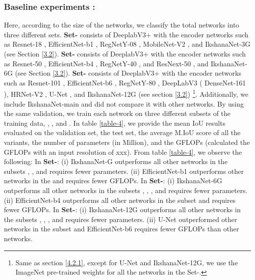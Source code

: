 \documentclass{article}
\begin{document}
\subsubsection{Baseline experiments :}
\label{4.3.1}
Here, according to the size of the networks, we classify the total networks into three different sets. \newline
\textbf{Set-} consists of DeeplabV3+ \cite{chen2018encoder} with the encoder networks such as Resnet-18 \cite{he2016deep}, EfficientNet-b1 \cite{TanL19}, RegNetY-08 \cite{RegNet}, MobileNet-V2 \cite{mobileNetV2}, and IkshanaNet-3G (see Section \ref{3.2}). \newline
\textbf{Set-} consists of  DeeplabV3+ \cite{chen2018encoder} with the encoder networks such as Resnet-50 \cite{he2016deep}, EfficientNet-b4 \cite{TanL19}, RegNetY-40 \cite{RegNet}, and ResNext-50 \cite{Resnext}, and IkshanaNet-6G (see Section \ref{3.2}). \newline
\textbf{Set-} consists of DeeplabV3+ \cite{chen2018encoder} with the encoder networks such as Resnet-101 \cite{he2016deep}, EfficientNet-b6 \cite{TanL19}, RegNetY-80 \cite{RegNet},  DeepLabV3 ( DenseNet-161 \cite{huang2017densely}), HRNet-V2 \cite{SunZJCXLMWLW19}, U-Net \cite{ronneberger2015u}, and IkshanaNet-12G (see section \ref{3.2}) \footnote{Same as section \ref{4.2.1}, except for U-Net \cite{ronneberger2015u} and IkshanaNet-12G, we use the ImageNet \cite{deng2009imagenet} pre-trained weights for all the networks in the Set-.}.\newline
Additionally, we include IkshanaNet-main and did not compare it with other networks. By using the same validation, we train each network on three different subsets of the training data, , , and .\newline
In table \ref{table-4}, we provide the mean IoU results evaluated on the validation set, the test set, the average M.IoU score of all the variants, the number of parameters (in Million), and the GFLOPs \cite{GFLOPS}  (calculated the GFLOPs with an input resolution of xxx). From table  \ref{table-4}, we observe the following:\newline
In \textbf{Set-}: (i) IkshanaNet-G outperforms all other networks in the subsets ,  , and requires fewer parameters.\newline
(ii) EfficientNet-b1 \cite{TanL19} outperforms other networks in the  and requires fewer GFLOPs. \newline
In \textbf{Set-}: (i) IkshanaNet-6G outperforms all other networks in the subsets , , , and requires fewer parameters. \newline
(ii) EfficientNet-b4 \cite{TanL19} outperforms all other networks in the subset  and requires fewer GFLOPs.\newline
In \textbf{Set-}: (i) IkshanaNet-12G outperforms all other networks in the subsets , , , and requires fewer parameters. \newline
(ii) U-Net \cite{ronneberger2015u} outperformed other networks in the  subset  and  EfficientNet-b6 \cite{TanL19} requires fewer GFLOPs than other networks.
\end{document}
